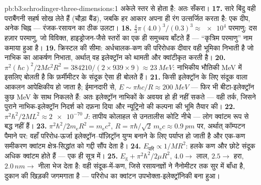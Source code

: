 \begin{solution}{pb:b3:schrodinger-three-dimensions:1}
अकेले स्तर से होता है: अतः सँकरा।
\textbf{17.} सारे बिंदु वही पराबैंगनी सहर्ष सोख लेते हैं
(चौड़ा बैंड), जबकि हर आकार अपना ही रंग उत्सर्जित करता है: एक दीप, अनेक
चिह्न --- रंजक-रसायन का ठीक उलटा।
\textbf{18.} $\tfrac43\pi(4.0)^3/(0.3)^3 \approx \num{e4}$ परमाणु:
दस हज़ार परमाणु, जो विविक्त, हाइड्रोजन-जैसे स्तरों का एक ही समुच्चय
बाँटते हैं --- ``कृत्रिम परमाणु'' नाम कमाया हुआ है।
\textbf{19.} क्रिस्टल की सीमा: अर्धचालक-कण की परिरोधक दीवार वही
भूमिका निभाती है जो नाभिक का आकर्षण निभाता, अर्थात् वह इलेक्ट्रॉन को
थामती और क्वांटीकृत करती है।
\textbf{20.} $\pi^2(\hbar c)^2/2Mc^2R^2 = 384210/(2 \times 939
\times 9) \approx \qty{23}{MeV}$: नाभिकीय भौतिकी MeV में इसलिए बोलती
है कि फ़र्मीमीटर के संदूक ऐसा ही बोलते हैं।
\textbf{21.} किसी इलेक्ट्रॉन के लिए संदूक वाला आकलन आपेक्षिकीय हो
जाता है; ईमानदारी से, $E \sim \pi\hbar c/R \approx \qty{200}{MeV}$ ---
फिर भी बीटा-इलेक्ट्रॉन कुछ MeV के साथ निकलते हैं: अतः इलेक्ट्रॉन
नाभिकों के अवयव हो ही नहीं सकते --- वही तर्क, जिसने पुराने
नाभिक-इलेक्ट्रॉन निदर्श को दफ़ना दिया और न्यूट्रिनो की कल्पना की भूमि तैयार की।
\textbf{22.} $\pi^2\hbar^2/2ML^2 \approx \qty{2e-70}{J}$:
तापीय कोलाहल से उनतालीस कोटि नीचे --- लोग क्वांटम रूप से बद्ध नहीं हैं।
\textbf{23.} $\pi^2\hbar^2/2m_{\text{e}}R^2 = m_{\text{e}}c^2$,
$R = \pi\hbar/\sqrt2\,m_{\text{e}}c \approx \qty{0.9}{pm}$ पर,
अर्थात् कॉम्पटन पैमाने पर: वहाँ परिरोध-ऊर्जा
इलेक्ट्रॉन--पॉज़िट्रॉन युग्म बनाने के लिए पर्याप्त हो जाती है और
एक-कण समीकरण क्वांटम क्षेत्र-सिद्धांत को गद्दी सौंप देता है।
\textbf{24.} $E_{\text{परि}} \propto 1/MR^2$: हलके कण और
छोटे संदूक अधिक क्वांटम होते हैं --- एक ही सूत्र में।
\textbf{25.} $E_{\text{g}} + \pi^2\hbar^2/2\mu R^2$, $4.0 \to$
लाल, $2.5 \to$ हरा, $2.0\,\unit{nm} \to$ नीला भेज देता है: वही
संदूक-में-कण, जिसे रसायनज्ञों ने नैनोमीटर तक सुर में बाँधा है, दुकान
की खिड़की जगमगाता है --- परिरोध का क्वांटन उपभोक्ता-इलेक्ट्रॉनिकी बना हुआ।
\end{solution}

